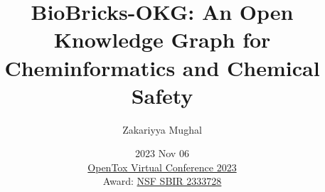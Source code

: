 \title[BioBricks-OKG]{BioBricks-OKG: An Open Knowledge Graph for Cheminformatics and Chemical Safety}
\author[Zaki Mughal]{Zakariyya Mughal}
\date[2023 Nov 06]{2023 Nov 06 \\[1ex]
\href{https://opentox.net/events/virtual-conference-2023/program}{OpenTox Virtual Conference 2023} \\[2ex]
%
Award:
\href{https://www.nsf.gov/awardsearch/showAward?AWD_ID=2333728}{NSF SBIR 2333728}
}
%
